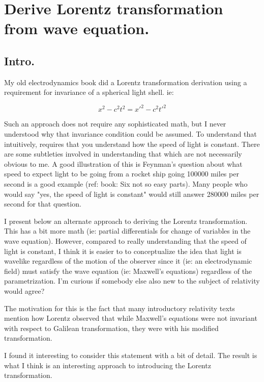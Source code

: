 \chapter{Derive Lorentz transformation from wave equation.}

\section{Intro.}

My old electrodynamics book did a Lorentz transformation derivation using a requirement for invariance of a spherical light shell.  ie:

\[
x^2 - c^2 t^2 = {x'}^2 - c^2 {t'}^2
\]

Such an approach does not require any sophisticated math, but I never understood why that invariance condition could be assumed.
To understand that intuitively, requires that you understand how the speed of light is constant.  There are some subtleties 
involved in understanding that which are not necessarily obvious to me.  A good illustration of this is Feynman's question
about what speed to expect light to be
going from a rocket ship going 100000 miles per second is a good example (ref: book: Six not so easy parts).
Many people who would say "yes, the speed of light is constant" would still answer 280000 miles per second for that question.

I present below an alternate approach to deriving the Lorentz transformation.  This has a bit more math (ie: partial differentials for 
change of variables in the wave equation).  However, compared to really understanding that the speed of light is constant,
I think it is easier to
to conceptualize the idea that light is wavelike regardless of the motion of the observer since it (ie: an electrodynamic field)
must satisfy the wave equation (ie: Maxwell's equations) regardless of the parametrization.  I'm curious if somebody
else also new to the subject of relativity would agree?

The motivation for this is the fact that many introductory relativity texts mention how Lorentz observed that
while Maxwell's equations were not invariant with respect to Galilean
transformation, they were with his modified transformation.

I found it interesting to consider this statement with a bit of detail.  The result is what I think is an interesting approach
to introducing the Lorentz transformation.


